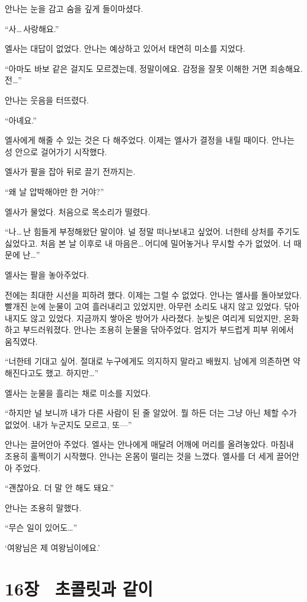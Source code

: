 안나는 눈을 감고 숨을 깊게 들이마셨다.

``사\ldots\,사랑해요.''

엘사는 대답이 없었다. 안나는 예상하고 있어서 태연히 미소를 지었다.

``아마도 바보 같은 걸지도 모르겠는데, 정말이에요. 감정을 잘못 이해한 거면 죄송해요. 전\ldots''

안나는 웃음을 터뜨렸다.

``아녜요.''

엘사에게 해줄 수 있는 것은 다 해주었다. 이제는 엘사가 결정을 내릴 때이다. 안나는 성 안으로 걸어가기 시작했다.

엘사가 팔을 잡아 뒤로 끌기 전까지는.

``왜 날 압박해야만 한 거야?''

엘사가 물었다. 처음으로 목소리가 떨렸다.

``나\ldots\,난 힘들게 부정해왔단 말이야. 널 정말 떠나보내고 싶었어. 너한테 상처를 주기도 싫었다고. 처음 본 날 이후로 내 마음은\ldots\,어디에 밀어놓거나 무시할 수가 없었어. 너 때문에 난\ldots''

엘사는 팔을 놓아주었다.

전에는 최대한 시선을 피하려 했다. 이제는 그럴 수 없었다. 안나는 엘사를 돌아보았다. 빨개진 눈에 눈물이 고여 흘러내리고 있었지만, 아무런 소리도 내지 않고 있었다. 닦아내지도 않고 있었다. 지금까지 쌓아온 방어가 사라졌다. 눈빛은 여리게 되었지만, 온화하고 부드러워졌다. 안나는 조용히 눈물을 닦아주었다. 엄지가 부드럽게 피부 위에서 움직였다.

``너한테 기대고 싶어. 절대로 누구에게도 의지하지 말라고 배웠지. 남에게 의존하면 약해진다고도 했고. 하지만\ldots''

엘사는 눈물을 흘리는 채로 미소를 지었다.

``하지만 널 보니까 내가 다른 사람이 된 줄 알았어. 뭘 하든 더는 그냥 아닌 체할 수가 없었어. 내가 누군지도 모르고, 또—''

안나는 끌어안아 주었다. 엘사는 안나에게 매달려 어깨에 머리를 올려놓았다. 마침내 조용히 훌쩍이기 시작했다. 안나는 온몸이 떨리는 것을 느꼈다. 엘사를 더 세게 끌어안아 주었다.

``괜찮아요. 더 말 안 해도 돼요.''

안나는 조용히 말했다.

``무슨 일이 있어도\ldots''

`여왕님은 제 여왕님이에요.'



\chapter[16장  초콜릿과 같이][16장\hspace*{.5em}초콜릿과 같이]{16장 \ 초콜릿과 같이}



